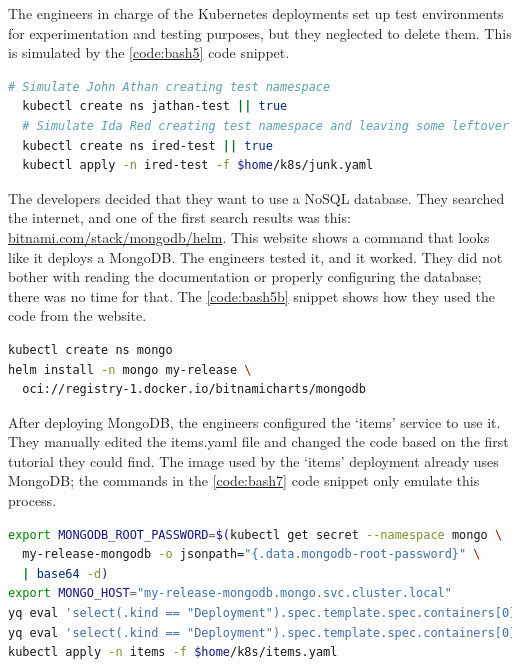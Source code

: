 The engineers in charge of the Kubernetes deployments set up test environments for experimentation and testing purposes, but they neglected to delete them. This is simulated by the \ref{code:bash5} code snippet.

\begin{lstlisting}[caption={Simulate leftover resources},language=bash,label=code:bash5]
  # Simulate John Athan creating test namespace
  kubectl create ns jathan-test || true
  # Simulate Ida Red creating test namespace and leaving some leftover resources in it
  kubectl create ns ired-test || true
  kubectl apply -n ired-test -f $home/k8s/junk.yaml
\end{lstlisting}

The developers decided that they want to use a NoSQL database. They searched the internet, and one of the first search results was this: \url{bitnami.com/stack/mongodb/helm}. This website shows a command that looks like it deploys a MongoDB. The engineers tested it, and it worked. They did not bother with reading the documentation or properly configuring the database; there was no time for that. The \ref{code:bash5b} snippet shows how they used the code from the website.

\begin{lstlisting}[caption={Deploy MongoDB},language=bash,label=code:bash5b]
kubectl create ns mongo
helm install -n mongo my-release \
  oci://registry-1.docker.io/bitnamicharts/mongodb
\end{lstlisting}

After deploying MongoDB, the engineers configured the `items' service to use it. They manually edited the items.yaml file and changed the code based on the first tutorial they could find. The image used by the `items' deployment already uses MongoDB; the commands in the \ref{code:bash7} code snippet only emulate this process.

\begin{lstlisting}[caption={Configuring the `items' app to use MongoDB},language=bash,label=code:bash7]
export MONGODB_ROOT_PASSWORD=$(kubectl get secret --namespace mongo \
  my-release-mongodb -o jsonpath="{.data.mongodb-root-password}" \
  | base64 -d)
export MONGO_HOST="my-release-mongodb.mongo.svc.cluster.local"
yq eval 'select(.kind == "Deployment").spec.template.spec.containers[0].env[0].value = env(MONGODB_ROOT_PASSWORD)' $home/k8s/items.yaml -i
yq eval 'select(.kind == "Deployment").spec.template.spec.containers[0].env[1].value = env(MONGO_HOST)' $home/k8s/items.yaml -i
kubectl apply -n items -f $home/k8s/items.yaml
\end{lstlisting}


